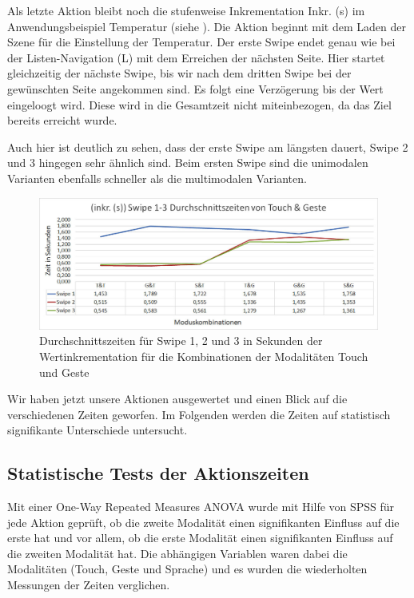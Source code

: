Als letzte Aktion bleibt noch die stufenweise Inkrementation Inkr. (s) im Anwendungsbeispiel Temperatur (siehe ). 
Die Aktion beginnt mit dem Laden der Szene für die Einstellung der Temperatur. 
Der erste Swipe endet genau wie bei der Listen-Navigation (L) mit dem Erreichen der nächsten Seite. 
Hier startet gleichzeitig der nächste Swipe, bis wir nach dem dritten Swipe bei der gewünschten Seite angekommen sind. 
Es folgt eine Verzögerung bis der Wert eingeloogt wird. 
Diese wird in die Gesamtzeit nicht miteinbezogen, da das Ziel bereits erreicht wurde. 

Auch hier ist deutlich zu sehen, dass der erste Swipe am längsten dauert, Swipe 2 und 3 hingegen sehr ähnlich sind. 
Beim ersten Swipe sind die unimodalen Varianten ebenfalls schneller als die multimodalen Varianten.
\begin{figure}[ht]
  \centering
  \includegraphics[width=1\textwidth]{img/Swipe1-3_Klima.JPG}
  \caption[Durchschnittszeiten für Inkr. (s)]{Durchschnittszeiten für Swipe 1, 2 und 3 in Sekunden der Wertinkrementation für die Kombinationen der Modalitäten Touch und Geste}
  \label{fig:SwipeKlima}
\end{figure} 

Wir haben jetzt unsere Aktionen ausgewertet und einen Blick auf die verschiedenen Zeiten geworfen.
Im Folgenden werden die Zeiten auf statistisch signifikante Unterschiede untersucht. 

\subsection[Statistische Tests]{Statistische Tests der Aktionszeiten}
Mit einer One-Way Repeated Measures ANOVA wurde mit Hilfe von SPSS für jede Aktion geprüft, ob die zweite Modalität einen signifikanten Einfluss auf die erste hat und vor allem, ob die erste Modalität einen signifikanten Einfluss auf die zweiten Modalität hat. 
Die abhängigen Variablen waren dabei die Modalitäten (Touch, Geste und Sprache) und es wurden die wiederholten Messungen der Zeiten verglichen. 

